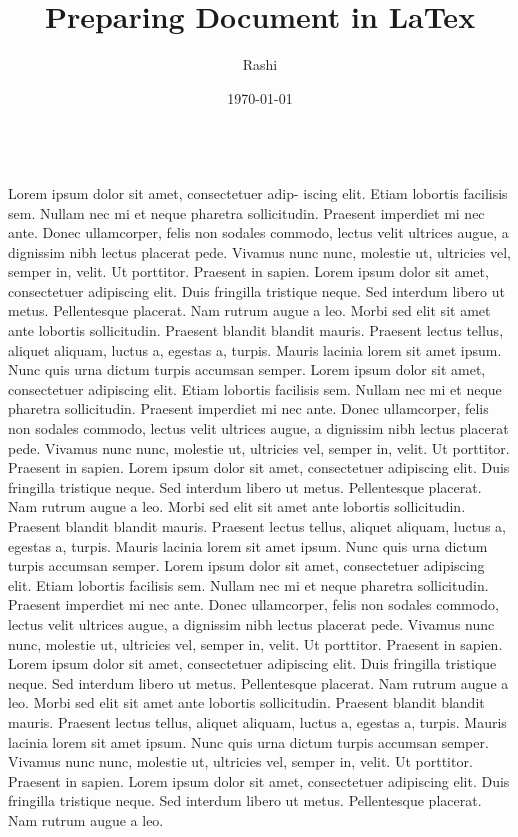 \documentclass[twocolumn]{article}
\begin{document}
	\title{Preparing Document in LaTex}
	\author{Rashi}
	\date{\today}
	\maketitle
	\textbf{\textit{\blindtext}}\\

	Lorem ipsum dolor sit amet, consectetuer adip-
	iscing elit. Etiam lobortis facilisis sem. Nullam
	nec mi et neque pharetra sollicitudin. Praesent
	imperdiet mi nec ante. Donec ullamcorper, felis
	non sodales commodo, lectus velit ultrices augue, a
	dignissim nibh lectus placerat pede. Vivamus nunc
	nunc, molestie ut, ultricies vel, semper in, velit. Ut
	porttitor. Praesent in sapien. Lorem ipsum dolor
	sit amet, consectetuer adipiscing elit. Duis fringilla
	tristique neque. Sed interdum libero ut metus.
	Pellentesque placerat. Nam rutrum augue a leo.
	Morbi sed elit sit amet ante lobortis sollicitudin.
	Praesent blandit blandit mauris. Praesent lectus
	tellus, aliquet aliquam, luctus a, egestas a, turpis.
	Mauris lacinia lorem sit amet ipsum. Nunc quis urna
	dictum turpis accumsan semper. Lorem ipsum dolor	
	sit amet, consectetuer adipiscing elit. Etiam lobortis
	facilisis sem. Nullam nec mi et neque pharetra
	sollicitudin. Praesent imperdiet mi nec ante. Donec
	ullamcorper, felis non sodales commodo, lectus velit
	ultrices augue, a dignissim nibh lectus placerat pede.
	Vivamus nunc nunc, molestie ut, ultricies vel, semper
	in, velit. Ut porttitor. Praesent in sapien. Lorem
	ipsum dolor sit amet, consectetuer adipiscing elit.
	Duis fringilla tristique neque. Sed interdum libero ut
	metus. Pellentesque placerat. Nam rutrum augue a
	leo. Morbi sed elit sit amet ante lobortis sollicitudin.
	Praesent blandit blandit mauris. Praesent lectus
	tellus, aliquet aliquam, luctus a, egestas a, turpis.
	Mauris lacinia lorem sit amet ipsum. Nunc quis urna
	dictum turpis accumsan semper. Lorem ipsum dolor
	sit amet, consectetuer adipiscing elit. Etiam lobortis
	facilisis sem. Nullam nec mi et neque pharetra
	sollicitudin. Praesent imperdiet mi nec ante. Donec
	ullamcorper, felis non sodales commodo, lectus velit
	ultrices augue, a dignissim nibh lectus placerat pede.
	Vivamus nunc nunc, molestie ut, ultricies vel, semper
	in, velit. Ut porttitor. Praesent in sapien. Lorem
	ipsum dolor sit amet, consectetuer adipiscing elit.
	Duis fringilla tristique neque. Sed interdum libero ut
	metus. Pellentesque placerat. Nam rutrum augue a
	leo. Morbi sed elit sit amet ante lobortis sollicitudin.
	Praesent blandit blandit mauris. Praesent lectus
	tellus, aliquet aliquam, luctus a, egestas a, turpis.
	Mauris lacinia lorem sit amet ipsum. Nunc quis urna
	dictum turpis accumsan semper.
	Vivamus nunc
	nunc, molestie ut, ultricies vel, semper in, velit. Ut
	porttitor. Praesent in sapien. Lorem ipsum dolor
	sit amet, consectetuer adipiscing elit. Duis fringilla
	tristique neque. Sed interdum libero ut metus.
	Pellentesque placerat. Nam rutrum augue a leo.
\end{document}
